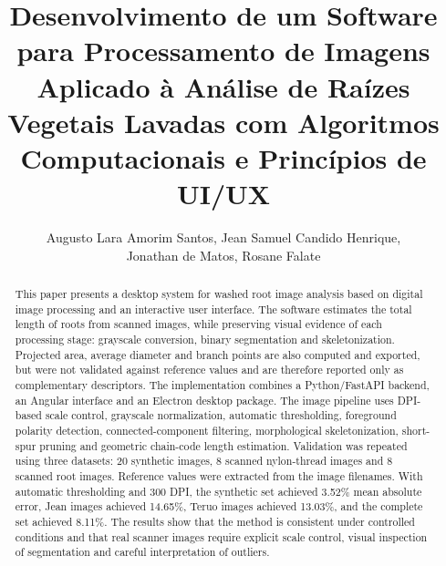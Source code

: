 \documentclass[12pt]{article}
\title{Desenvolvimento de um Software para Processamento de Imagens Aplicado à Análise
de Raízes Vegetais Lavadas com Algoritmos Computacionais e Princípios de UI/UX}
\author{Augusto Lara Amorim Santos\inst{1}, Jean Samuel Candido Henrique\inst{1},\\ Jonathan de Matos\inst{1}, Rosane Falate\inst{1}}
\begin{document}
\maketitle

\begin{abstract}
This paper presents a desktop system for washed root image analysis based on digital image processing and an interactive user interface. The software estimates the total length of roots from scanned images, while preserving visual evidence of each processing stage: grayscale conversion, binary segmentation and skeletonization. Projected area, average diameter and branch points are also computed and exported, but were not validated against reference values and are therefore reported only as complementary descriptors. The implementation combines a Python/FastAPI backend, an Angular interface and an Electron desktop package. The image pipeline uses DPI-based scale control, grayscale normalization, automatic thresholding, foreground polarity detection, connected-component filtering, morphological skeletonization, short-spur pruning and geometric chain-code length estimation. Validation was repeated using three datasets: 20 synthetic images, 8 scanned nylon-thread images and 8 scanned root images. Reference values were extracted from the image filenames. With automatic thresholding and 300 DPI, the synthetic set achieved 3.52\% mean absolute error, Jean images achieved 14.65\%, Teruo images achieved 13.03\%, and the complete set achieved 8.11\%. The results show that the method is consistent under controlled conditions and that real scanner images require explicit scale control, visual inspection of segmentation and careful interpretation of outliers.
\end{abstract}
\end{document}
